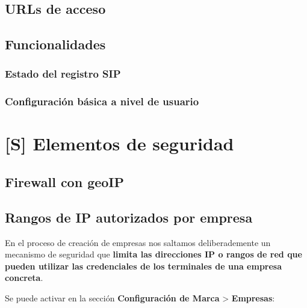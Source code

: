 \documentclass[letterpaper,10pt,spanish]{sphinxmanual}
\begin{document}
\section{URLs de acceso}
\label{userportal/index:urls-de-acceso}

\section{Funcionalidades}
\label{userportal/index:funcionalidades}

\subsection{Estado del registro SIP}
\label{userportal/index:estado-del-registro-sip}

\subsection{Configuración básica a nivel de usuario}
\label{userportal/index:configuracion-basica-a-nivel-de-usuario}

\chapter{{[}S{]} Elementos de seguridad}
\label{security/index::doc}\label{security/index:s-elementos-de-seguridad}

\section{Firewall con geoIP}
\label{security/index:firewall-con-geoip}

\section{Rangos de IP autorizados por empresa}
\label{security/index:rangos-de-ip-autorizados-por-empresa}
En el proceso de creación de empresas nos saltamos deliberademente un mecanismo de seguridad que \textbf{limita las direcciones IP o rangos de red que pueden utilizar las credenciales de los terminales de una empresa concreta}.

Se puede activar en la sección \textbf{Configuración de Marca} \textgreater{} \textbf{Empresas}:

\end{document}
